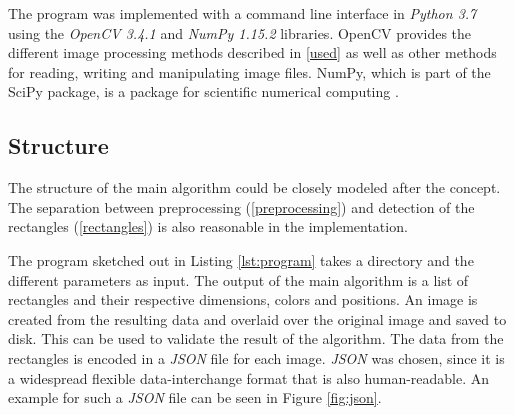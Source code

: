 \documentclass[serif,article,noparskip]{agse-thesis}
\begin{document}
The program was implemented with a command line interface in \textit{Python 3.7}
using the \textit{OpenCV 3.4.1} and \textit{NumPy 1.15.2} libraries. OpenCV
provides the different image processing methods described in \ref{used} as well
as other methods for reading, writing and manipulating image files. NumPy, which
is part of the SciPy package, is a package for scientific numerical computing
\cite{scipy}.

\subsection{Structure} \label{structure}

The structure of the main algorithm could be closely modeled after the concept.
The separation between preprocessing (\ref{preprocessing}) and detection of the
rectangles (\ref{rectangles}) is also reasonable in the implementation.

The program sketched out in Listing \ref{lst:program} takes a directory and the
different parameters as input. The output of the main algorithm is a list of
rectangles and their respective dimensions, colors and positions. An image is
created from the resulting data and overlaid over the original image and saved
to disk. This can be used to validate the result of the algorithm. The data from
the rectangles is encoded in a \textit{JSON} file for each image. \textit{JSON}
was chosen, since it is a widespread flexible data-interchange format that is
also human-readable. An example for such a \textit{JSON} file can be seen in
Figure \ref{fig:json}.
\end{document}
